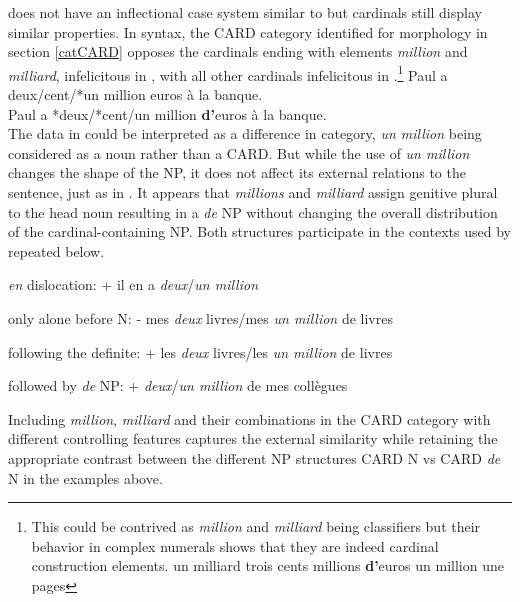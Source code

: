 \documentclass[output=paper]{langsci/langscibook}
\begin{document}
 does not have an inflectional  case system similar to  but cardinals  still display similar properties.
In syntax, the CARD category identified for morphology in section \ref{catCARD} opposes the cardinals  ending with elements \emph{million} and \emph{milliard}, infelicitous in , with all other cardinals infelicitous in .\footnote{This could be contrived as \emph{million} and \emph{milliard} being classifiers but their behavior in complex numerals shows that they are indeed cardinal construction elements.
\ea un milliard trois cents millions \textbf{d'}euros 
\ex un million une pages 
\z}
\ea\label{numOpposition}
	\ea\label{numN} Paul a deux/cent/*un million euros à la banque. \\
	\ex\label{numDeN} Paul a *deux/*cent/un million \textbf{d'}euros à la banque. \\
	\z
\z
The data in  could be interpreted as a difference in category, \emph{un million} being considered as a noun rather than a CARD.
But while the use of \emph{un million} changes the shape of the NP, it does not affect its external relations to the sentence, just as in . It appears that \emph{millions} and \emph{milliard} assign genitive plural to the head noun resulting in a \emph{de} NP without changing the overall distribution of the cardinal-containing NP.
Both structures participate in the contexts  used by \cite{Saulnier10} repeated below.
\ea
\begin{description}
    \item \emph{en} dislocation: + \fldr{} il en a \emph{deux}/\emph{un million}\\
    \item only alone before N: - \fldr{} mes \emph{deux} livres/mes \emph{un million} de livres\\
    \item following the definite: + \fldr{} les \emph{deux} livres/les \emph{un million} de livres\\
    \item followed by \emph{de} NP: + \fldr{} \emph{deux}/\emph{un million} de mes collègues\\
\end{description}
\z
Including \emph{million}, \emph{milliard} and their combinations in the CARD category with different controlling features captures the external similarity while retaining the appropriate contrast between the different NP structures CARD N vs CARD \emph{de} N in the examples above.
\end{document}
